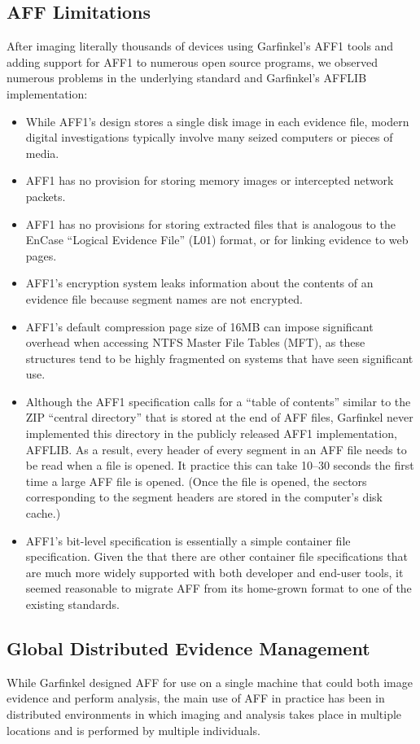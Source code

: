\documentclass[10pt, conference]{IEEEtran}
\begin{document}
\subsection{AFF Limitations}
After imaging literally thousands of devices using Garfinkel's AFF1
tools and adding support for AFF1 to numerous open source programs, we
observed numerous problems in the underlying standard
and Garfinkel's AFFLIB implementation:

\begin{itemize}
\item While AFF1's design stores a single disk image in each evidence
  file, modern digital investigations typically involve many seized
  computers or pieces of media. 
\item AFF1 has no provision for storing memory images or intercepted
  network packets.
\item AFF1 has no provisions for storing extracted files that is
  analogous to the EnCase ``Logical Evidence File'' (L01) format, or
  for linking evidence to web pages.
\item AFF1's encryption system leaks information about the contents of
  an evidence file because segment names are not encrypted.
\item AFF1's default compression page size of 16MB can impose significant overhead
  when accessing NTFS Master File Tables (MFT), as these structures
  tend to be highly fragmented on systems that have seen significant
  use. 
\item Although the AFF1 specification calls for a ``table of contents'' similar
  to the ZIP\cite{zip-format} ``central directory'' that is stored at the end of AFF
  files, Garfinkel never implemented this directory in the publicly
  released AFF1 implementation, AFFLIB. As a result, every header of every segment in an
  AFF file needs to be read when a file is opened. It practice this
  can take 10--30 seconds the first time a large AFF file is
  opened. (Once the file is opened, the sectors corresponding to the
  segment headers are stored in the computer's disk cache.)
\item AFF1's bit-level specification is essentially a simple container
  file specification. Given the that there are other container file
  specifications that are much more widely supported with both
  developer and end-user tools, it seemed reasonable to migrate AFF
  from its home-grown format to one of the existing standards. 
\end{itemize}

\subsection{Global Distributed Evidence Management}
While Garfinkel designed AFF for use on a single machine that could
both image evidence and perform analysis, the main use of AFF in
practice has been in distributed environments in which imaging and
analysis takes place in multiple locations and is performed by
multiple individuals.
\end{document}

